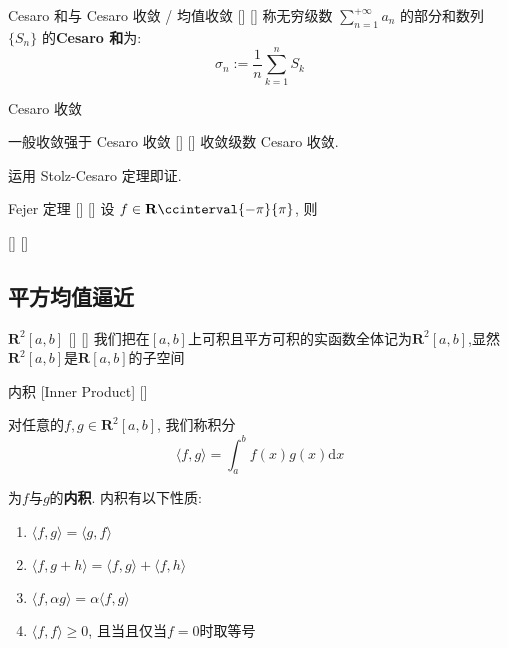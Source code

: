 \documentclass[UTF8]{ctexart}
\begin{document}
			\begin{dfn}
			    []
			    {Cesaro 和与 Cesaro 收敛 / 均值收敛}
			    []
			    []
				称无穷级数 \(\sum\limits_{n=1}^{+\infty}a_n\) 的部分和数列 \(\{S_n\}\) 的\textbf{Cesaro 和}为: 
				\[\sigma_n:=\frac{1}{n}\sum_{k=1}^{n}S_k\]

			    {}
			    {Cesaro 收敛}
			    {}
			    {}
			\end{dfn}

			\begin{ppt}
			    []
			    {一般收敛强于 Cesaro 收敛}
			    []
			    []
				收敛级数 Cesaro 收敛. 
			\end{ppt}

			\begin{prf}
				运用 Stolz-Cesaro 定理即证. 
			\end{prf}

			\begin{thm}
			    []
			    {Fejer 定理}
			    []
			    []
				设 \(f\in\mathbf{R}\ccinterval{-\pi}{\pi}\), 则
			\end{thm}

			\begin{thm}
				    []
				    {}
				    []
				    []
			\end{thm}

		\subsection{平方均值逼近}
			
			\begin{dfn}
                    []
                    {\(\mathbf{R}^2[a,b]\)}
                    []
                    []
				我们把在\([a,b]\)上可积且平方可积的实函数全体记为\(\mathbf{R}^2[a,b]\),显然\(\mathbf{R}^2[a,b]\)是\(\mathbf{R}[a,b]\)的子空间
			\end{dfn}
			
			\begin{dfn}
                    []
                    {内积}
                    [Inner Product]
                    []

				对任意的\(f,g\in \mathbf{R}^2[a,b]\), 我们称积分
				\[\langle f,g \rangle=\int_{a}^{b}f(x)g(x)\text{d}x\]

				为\(f\)与\(g\)的\textbf{内积}. 内积有以下性质: 
				\begin{enumerate}
					\item \(\langle f,g \rangle=\langle g,f \rangle\)
					\item \(\langle f,g+h \rangle=\langle f,g \rangle+\langle f,h \rangle\)
					\item \(\langle f,\alpha g \rangle=\alpha\langle f,g \rangle\)
					\item \(\langle f,f \rangle\geq 0\), 且当且仅当\(f=0\)时取等号
				\end{enumerate}
			\end{dfn}
\end{document}
